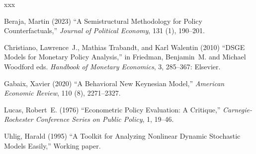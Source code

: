 \documentclass[11pt]{article}
\theoremstyle{remark}
\begin{document}
\begin{thebibliography}{xxx}

Beraja, Martin (2023) ``A Semistructural Methodology for Policy
  Counterfactuals,'' \textit{Journal of Political Economy}, 131 (1),  190--201.

Christiano, Lawrence~J., Mathias Trabandt, and Karl Walentin (2010) ``{DSGE}
  Models for Monetary Policy Analysis,'' in Friedman, Benjamin~M. and Michael
  Woodford eds.   \textit{Handbook of Monetary Economics}, 3,  285--367:
  Elsevier.

Gabaix, Xavier (2020) ``A Behavioral {New} {Keynesian} Model,''
  \textit{American Economic Review}, 110 (8),  2271--2327.

Lucas, Robert~E. (1976) ``Econometric Policy Evaluation: A Critique,''
  \textit{Carnegie-Rochester Conference Series on Public Policy}, 1,  19--46.

Uhlig, Harald (1995) ``A Toolkit for Analyzing Nonlinear Dynamic Stochastic
  Models Easily,'' Working paper.

\end{thebibliography}
\end{document}
